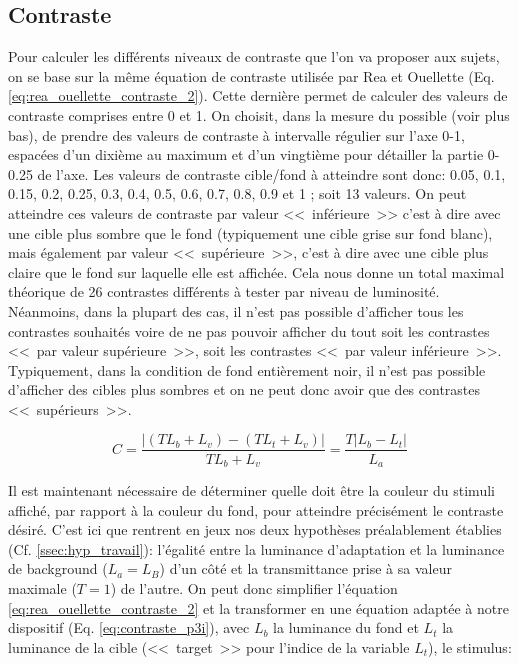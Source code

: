 	\subsection{Contraste}
	\label{ssec:contraste}
	\par Pour calculer les différents niveaux de contraste que l'on va proposer aux sujets, on se base sur la même équation de contraste utilisée par Rea et Ouellette (Eq. \ref{eq:rea_ouellette_contraste_2}). Cette dernière permet de calculer des valeurs de contraste comprises entre 0 et 1. On choisit, dans la mesure du possible (voir plus bas), de prendre des valeurs de contraste à intervalle régulier sur l'axe 0-1, espacées d'un dixième au maximum et d'un vingtième pour détailler la partie 0-0.25 de l'axe. Les valeurs de contraste cible/fond à atteindre sont donc: 0.05, 0.1, 0.15, 0.2, 0.25, 0.3, 0.4, 0.5, 0.6, 0.7, 0.8, 0.9 et 1 ; soit 13 valeurs. On peut atteindre ces valeurs de contraste par valeur <<~inférieure~>> c'est à dire avec une cible plus sombre que le fond (typiquement une cible grise sur fond blanc), mais également par valeur <<~supérieure~>>, c'est à dire avec une cible plus claire que le fond sur laquelle elle est affichée. Cela nous donne un total maximal théorique de 26 contrastes différents à tester par niveau de luminosité. Néanmoins, dans la plupart des cas, il n'est pas possible d'afficher tous les contrastes souhaités voire de ne pas pouvoir afficher du tout soit les contrastes <<~par valeur supérieure~>>, soit les contrastes <<~par valeur inférieure~>>. Typiquement, dans la condition de fond entièrement noir, il n'est pas possible d'afficher des cibles plus sombres et on ne peut donc avoir que des contrastes <<~supérieurs~>>.
	
	\begin{equation}
		C = \frac{\vert (T L_b + L_v) - (T L_t + L_v) \vert}{T L_b + L_v} = \frac{T \vert L_b - L_t \vert}{L_a}
		\label{eq:rea_ouellette_contraste_2}
	\end{equation}
	
	\par Il est maintenant nécessaire de déterminer quelle doit être la couleur du stimuli affiché, par rapport à la couleur du fond, pour atteindre précisément le contraste désiré. C'est ici que rentrent en jeux nos deux hypothèses préalablement établies (Cf. \ref{ssec:hyp_travail}): l'égalité entre la luminance d'adaptation et la luminance de background ($L_a = L_B$) d'un côté et la transmittance prise à sa valeur maximale ($T = 1$) de l'autre. On peut donc simplifier l'équation \ref{eq:rea_ouellette_contraste_2} et la transformer en une équation adaptée à notre dispositif (Eq. \ref{eq:contraste_p3i}), avec $L_b$ la luminance du fond et $L_t$ la luminance de la cible (<<~target~>> pour l'indice de la variable $L_t$), le stimulus:
	
